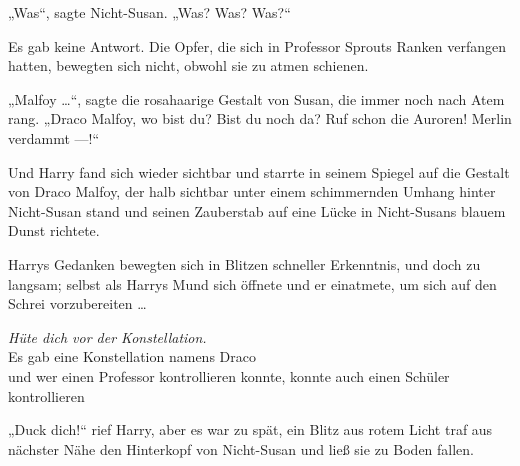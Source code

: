 „Was“, sagte Nicht-Susan.
„Was? Was? Was?“

Es gab keine Antwort. Die Opfer, die sich in Professor Sprouts Ranken verfangen hatten, bewegten sich nicht, obwohl sie zu atmen schienen.

„Malfoy …“, sagte die rosahaarige Gestalt von Susan, die immer noch nach Atem rang.
„Draco Malfoy, wo bist du? Bist du noch da? Ruf schon die Auroren! Merlin verdammt —!“ 

Und Harry fand sich wieder sichtbar und starrte in seinem Spiegel auf die Gestalt von Draco Malfoy, der halb sichtbar unter einem schimmernden Umhang hinter Nicht-Susan stand und seinen Zauberstab auf eine Lücke in Nicht-Susans blauem Dunst richtete.

Harrys Gedanken bewegten sich in Blitzen schneller Erkenntnis, und doch zu langsam; selbst als Harrys Mund sich öffnete und er einatmete, um sich auf den Schrei vorzubereiten …

\noindent{}\emph{Hüte dich vor der Konstellation.}\\
Es gab eine Konstellation namens Draco\\
und wer einen Professor kontrollieren konnte, konnte auch einen Schüler kontrollieren

„Duck dich!“ rief Harry, aber es war zu spät, ein Blitz aus rotem Licht traf aus nächster Nähe den Hinterkopf von Nicht-Susan und ließ sie zu Boden fallen.

